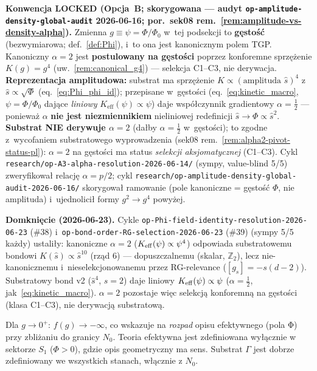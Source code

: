 \begin{uwaga}
\label{rem:K_to_f_amplitude}
\textbf{Konwencja LOCKED (Opcja~B; skorygowana --- audyt \texttt{op-amplitude-density-global-audit} 2026-06-16;
por.\ sek08 rem.~\ref{rem:amplitude-vs-density-alpha}).}
Zmienna $g\equiv\psi=\Phi/\Phi_0$ w~tej podsekcji to \textbf{g\k{e}sto\'s\'c} (bezwymiarowa; def.~\ref{def:Phi}),
i~to ona jest kanonicznym polem TGP. Kanoniczny $\alpha=2$ jest \textbf{postulowany na g\k{e}sto\'sci} poprzez
konforemne sprz\k{e}\.zenie $K(g)=g^4$ (uw.~\ref{rem:canonical_g4}) --- selekcja C1--C3, nie derywacja.
\textbf{Reprezentacja amplitudowa:} substrat ma sprz\k{e}\.zenie $K\propto(\text{amplituda }\hat s)^4$ z~$\hat s\propto\sqrt{\Phi}$
(eq.~\eqref{eq:Phi_phi_id}); przepisane w~g\k{e}sto\'sci (eq.~\eqref{eq:kinetic_macro}, $\psi=\Phi/\Phi_0$
daj\k{a}ce \emph{liniowy} $K_\mathrm{eff}(\psi)\propto\psi$) daje wsp\'o\l{}czynnik gradientowy
$\alpha=\tfrac12$ --- poniewa\.z $\alpha$ \textbf{nie jest niezmiennikiem} nieliniowej redefinicji
$\hat s\to\Phi\propto\hat s^2$. \textbf{Substrat NIE derywuje $\alpha=2$} (da\l{}by $\alpha=\tfrac12$ w~g\k{e}sto\'sci);
to zgodne z~wycofaniem substratowego wyprowadzenia (sek08 rem.~\ref{rem:alpha2-pivot-status-pl}):
$\alpha=2$ na g\k{e}sto\'sci ma status \emph{selekcji aksjomatycznej} (C1--C3). Cykl
\texttt{research/op-A3-alpha-resolution-2026-06-14/} (sympy, value-blind 5/5) zweryfikowa\l{} relacj\k{e}
$\alpha=p/2$; cykl \texttt{research/op-amplitude-density-global-audit-2026-06-16/} skorygowa\l{} ramowanie
(pole kanoniczne = g\k{e}sto\'s\'c $\Phi$, nie amplituda) i~ujednolici\l{} formy $g^2\to g^4$ powy\.zej.

\medskip\noindent\textbf{Domkni\k{e}cie (2026-06-23).} Cykle
\texttt{op-Phi-field-identity-resolution-2026-06-23} (\#38) i~\texttt{op-bond-order-RG-selection-2026-06-23}
(\#39) (sympy 5/5 ka\.zdy) ustali\l{}y: kanoniczne $\alpha=2$ ($K_{\rm eff}(\psi)\propto\psi^4$) odpowiada
substratowemu bondowi $K(\hat s)\propto\hat s^{10}$ (rz\k{a}d 6) --- dopuszczalnemu (skalar, $\mathbb{Z}_2$),
lecz nie-kanonicznemu i~nieselekcjonowanemu przez RG-relevance ($[g_s]=-s(d-2)$). Substratowy bond v2
($\hat s^4$, $s{=}2$) daje liniowy $K_{\rm eff}(\psi)\propto\psi$ ($\alpha=\tfrac12$, jak~\eqref{eq:kinetic_macro}).
$\alpha=2$ pozostaje wi\k{e}c selekcj\k{a} konforemn\k{a} na g\k{e}sto\'sci (klasa C1--C3), nie derywacj\k{a}
substratow\k{a}.
\end{uwaga}

\begin{wniosek}
Dla $g \to 0^+$: $f(g) \to -\infty$, co wskazuje na \emph{rozpad}
opisu efektywnego (pola Φ) przy zbliżaniu do granicy $N_0$. Teoria
efektywna jest zdefiniowana wyłącznie w sektorze $S_1$ ($\Phi > 0$),
gdzie opis geometryczny ma sens. Substrat $\Gamma$ jest dobrze
zdefiniowany we wszystkich stanach, włącznie z $N_0$.
\end{wniosek}

